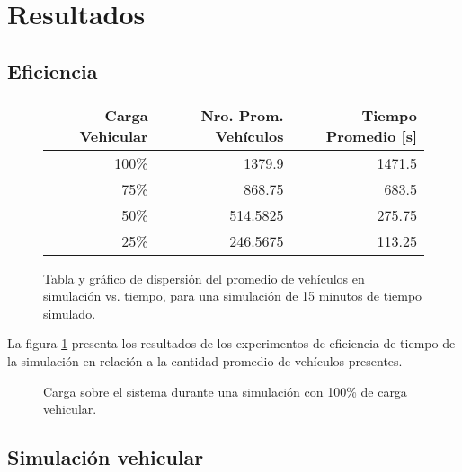 \section{Resultados}
\subsection{Eficiencia}

\begin{figure}[tpb]
    \centering
    \begin{tabular}{@{}rrr@{}}
        \textbf{Carga Vehicular} & \textbf{Nro. Prom. Vehículos} & \textbf{Tiempo Promedio [s]} \\ \midrule
        100\%           & 1379.9          & 1471.5              \\ %
        75\%            & 868.75          & 683.5               \\ %
        50\%            & 514.5825        & 275.75              \\ %
        25\%            & 246.5675        & 113.25              \\ \bottomrule
    \end{tabular}
    
    \caption{Tabla y gráfico de dispersión del promedio de vehículos en simulación vs. tiempo, para una simulación de 15 minutos de tiempo simulado.}
    \label{fig:vehiclesvstime}
\end{figure}

La figura \ref{fig:vehiclesvstime} presenta los resultados de los experimentos de eficiencia de tiempo de la simulación en relación a la cantidad promedio de vehículos presentes.

\begin{figure}[tpb]
    \centering
    
    \caption{Carga sobre el sistema durante una simulación con 100\% de carga vehicular.}
    \label{fig:systemload}
\end{figure}

\subsection{Simulación vehicular}